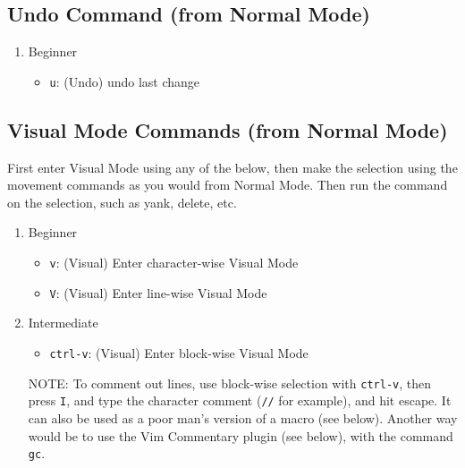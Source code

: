 \documentclass[11pt]{article}
\begin{document}
\subsection{Undo Command (from Normal Mode)}
\label{sec:org767a8ec}
\begin{enumerate}
\item Beginner
\label{sec:orgf542dee}
\begin{itemize}
\item \texttt{u}: (Undo) undo last change
\end{itemize}
\end{enumerate}
\subsection{Visual Mode Commands (from Normal Mode)}
\label{sec:orgca80dd2}
First enter Visual Mode using any of the below, then make the selection using
the movement commands as you would from Normal Mode. Then run the command on the
selection, such as yank, delete, etc.
\begin{enumerate}
\item Beginner
\label{sec:org714c274}
\begin{itemize}
\item \texttt{v}: (Visual) Enter character-wise Visual Mode
\item \texttt{V}: (Visual) Enter line-wise Visual Mode
\end{itemize}
\item Intermediate
\label{sec:org8068eed}
\begin{itemize}
\item \texttt{ctrl-v}: (Visual) Enter block-wise Visual Mode
\end{itemize}

NOTE: To comment out lines, use block-wise selection with \texttt{ctrl-v}, then press \texttt{I},
and type the character comment (\texttt{//} for example), and hit escape. It can also
be used as a poor man's version of a macro (see below). Another way would be to
use the Vim Commentary plugin (see below), with the command \texttt{gc}.
\end{enumerate}
\end{document}
